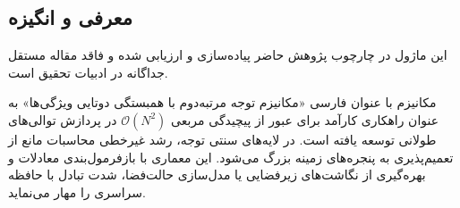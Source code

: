 \subsection{معرفی و انگیزه}
این ماژول در چارچوب پژوهش حاضر پیاده‌سازی و ارزیابی شده و فاقد مقاله مستقل جداگانه در ادبیات تحقیق است.

مکانیزم  با عنوان فارسی «مکانیزم توجه مرتبه‌دوم با همبستگی دوتایی ویژگی‌ها» به عنوان راهکاری کارآمد برای عبور از پیچیدگی مربعی $\mathcal{O}(N^2)$ در پردازش توالی‌های طولانی توسعه یافته است. در لایه‌های سنتی توجه، رشد غیرخطی محاسبات مانع از تعمیم‌پذیری به پنجره‌های زمینه بزرگ می‌شود. این معماری با بازفرمول‌بندی معادلات و بهره‌گیری از نگاشت‌های زیرفضایی یا مدل‌سازی حالت‌فضا، شدت تبادل با حافظه سراسری را مهار می‌نماید.
